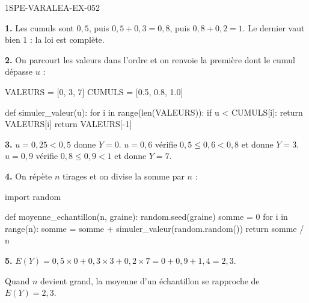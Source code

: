 \begin{corrige}{1SPE-VARALEA-EX-052}

\textbf{1.} Les cumuls sont $0{,}5$, puis $0{,}5+0{,}3 = 0{,}8$, puis
$0{,}8+0{,}2 = 1$. Le dernier vaut bien $1$ : la loi est complète.

\medskip
\textbf{2.} On parcourt les valeurs dans l'ordre et on renvoie la première dont
le cumul dépasse $u$ :

\begin{python}
VALEURS = [0, 3, 7]
CUMULS = [0.5, 0.8, 1.0]

def simuler_valeur(u):
    for i in range(len(VALEURS)):
        if u < CUMULS[i]:
            return VALEURS[i]
    return VALEURS[-1]
\end{python}

\medskip
\textbf{3.} $u = 0{,}25 < 0{,}5$ donne $Y = 0$.
$u = 0{,}6$ vérifie $0{,}5 \leq 0{,}6 < 0{,}8$ et donne $Y = 3$.
$u = 0{,}9$ vérifie $0{,}8 \leq 0{,}9 < 1$ et donne $Y = 7$.

\medskip
\textbf{4.} On répète $n$ tirages et on divise la somme par $n$ :

\begin{python}
import random

def moyenne_echantillon(n, graine):
    random.seed(graine)
    somme = 0
    for i in range(n):
        somme = somme + simuler_valeur(random.random())
    return somme / n
\end{python}

\medskip
\textbf{5.} $E(Y) = 0{,}5 \times 0 + 0{,}3 \times 3 + 0{,}2 \times 7
= 0 + 0{,}9 + 1{,}4 = 2{,}3$.

Quand $n$ devient grand, la moyenne d'un échantillon se rapproche de $E(Y) = 2{,}3$.

\end{corrige}
